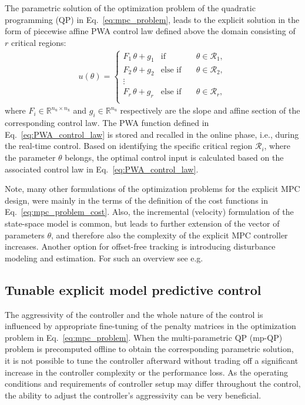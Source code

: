 \documentclass[preprint,12pt]{elsarticle}
\begin{document}
	The parametric solution of the optimization problem of the quadratic programming (QP) in Eq.~\eqref{eq:mpc_problem}, leads to the explicit solution in the form of piecewise affine PWA control law defined above the domain consisting of $r$ critical regions:
	\begin{eqnarray}
		\label{eq:PWA_control_law}
		u(\theta) = \left\{ 
		\begin{matrix}
			F_{1} \, \theta + g_{1} & \mathrm{if} & \quad \theta \in \mathcal{R}_1, \\
			F_{2} \, \theta + g_{2} & \mathrm{else}\,\,\mathrm{if} &\quad \theta \in \mathcal{R}_2, \\
			\vdots & \\
			F_{r} \, \theta + g_{r} & \mathrm{else}\,\,\mathrm{if} & \quad \theta \in \mathcal{R}_{r}, \\
		\end{matrix}
		\right.
	\end{eqnarray}
	where $F_{i} \in \mathbb{R}^{n_{\mathrm{u}} \times n_{\mathrm{x}}}$ and $g_{i}  \in \mathbb{R}^{n_{\mathrm{u}}}$ respectively are the slope and affine section of the corresponding control law. The PWA function defined in Eq.~\eqref{eq:PWA_control_law} is stored and recalled in the online phase, i.e., during the real-time control. Based on identifying the specific critical region $\mathcal{R}_{i}$, where the parameter $\theta$ belongs, the optimal control input is calculated based on the associated control law in Eq.~\eqref{eq:PWA_control_law}.
	
	Note, many other formulations of the optimization problems for the explicit MPC design, were mainly in the terms of the definition of the cost functions in Eq.~\eqref{eq:mpc_problem_cost}. Also, the incremental (velocity) formulation of the state-space model is common, but leads to further extension of the vector of parameters $\theta$, and therefore also the complexity of the explicit MPC controller increases. Another option for offset-free tracking is introducing disturbance modeling and estimation. For such an overview see e.g.~\cite{Klauco_mpc} 

	
	\subsection{Tunable explicit model predictive control}
	\label{sec:tunable}
	
	The aggressivity of the controller and the whole nature of the control is influenced by appropriate fine-tuning of the penalty matrices in the optimization problem in Eq.~\eqref{eq:mpc_problem}. When the multi-parametric QP (mp-QP) problem is precomputed offline to obtain the corresponding parametric solution, it is not possible to tune the controller afterward without trading off a significant increase in the controller complexity or the performance loss. As the operating conditions and requirements of controller setup may differ throughout the control, the ability to adjust the controller's aggressivity can be very beneficial.
	
\end{document}
